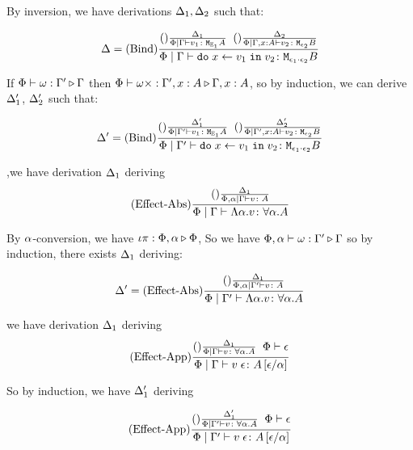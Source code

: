 {    
    By inversion, we have derivations $\Delta_1, \Delta_2$ such that:


    \begin{equation}
        \Delta = (\text{Bind}) \frac{
            (\text{}) \frac{\Delta_1}{\Phi\mid\Gamma \vdash v_1 \colon \texttt{M}_{\mathbb{E}_1}{A}}
            \;\;
            (\text{}) \frac{\Delta_2}{\Phi\mid\Gamma,x: A \vdash v_2 \colon \texttt{M}_{\epsilon_2}{B}}
        }{
            \Phi\mid\Gamma \vdash \texttt{do}\; x \leftarrow v_1 \;\texttt{in}\; v_2 \colon \texttt{M}_{\epsilon_1\cdot\epsilon_2}{B}
        }
    \end{equation}

    If $\Phi\vdash \omega : \Gamma' \triangleright \Gamma$ then $\Phi\vdash \omega\times : \Gamma',x:A \triangleright \Gamma, x: A$, so by induction, we can derive $\Delta_1'$, $\Delta_2'$ such that:

    \begin{equation}
        \Delta' = (\text{Bind}) \frac{
            (\text{}) \frac{\Delta_1'}{\Phi\mid\Gamma' \vdash v_1 \colon \texttt{M}_{\mathbb{E}_1}{A}}
            \;\;
            (\text{}) \frac{\Delta_2'}{\Phi\mid\Gamma',x: A \vdash v_2 \colon \texttt{M}_{\epsilon_2}{B}}
        }{
            \Phi\mid\Gamma' \vdash \texttt{do}\; x \leftarrow v_1 \;\texttt{in}\; v_2 \colon \texttt{M}_{\epsilon_1\cdot\epsilon_2}{B}
        }
    \end{equation}

        \bi,we have derivation $\Delta_1$ deriving
        \begin{equation}
            (\text{Effect-Abs}) \frac{
                    (\text{}) \frac{\Delta_1}{\Phi,\alpha\mid\Gamma \vdash v \colon A}}{\Phi\mid\Gamma \vdash \Lambda \alpha. v \colon \forall \alpha. A
                    }
        \end{equation}
        
        By $\alpha$-conversion, we have $\iota\pi : \Phi,\alpha \triangleright \Phi$,
        So we have $\Phi,\alpha\vdash \omega : \Gamma' \triangleright \Gamma$ so by induction, there exists $\Delta_1$ deriving:

        \begin{equation}
            \D' = 
            \treerule{Effect-Abs}{
                \treerule{}{\D_1}{\etyperelation{\P,\a}{\G'}{v}{A}}
            }{
                \etyperelation{
                    \P
                }{
                    \G'
                }{
                    \elam{\a}{v}
                }{\all{\a}{A}}
            }
        \end{equation}

    \bi we have derivation $\Delta_1$ deriving
    \begin{equation}
        (\text{Effect-App}) \frac{
            (\text{}) \frac{\Delta_1}{\Phi\mid\Gamma \vdash v \colon \forall \alpha. A}
            \;\;
           \Phi\vdash \epsilon
        }{
            \Phi\mid\Gamma \vdash v\;\epsilon \colon A\left[\epsilon / \alpha\right]
        }
    \end{equation}

    So by induction, we have $\Delta_1'$ deriving

    \begin{equation}
        (\text{Effect-App}) \frac{
            (\text{}) \frac{\Delta_1'}{\Phi\mid\Gamma' \vdash v \colon \forall \alpha. A}
            \;\;
           \Phi\vdash \epsilon
        }{
            \Phi\mid\Gamma' \vdash v\;\epsilon \colon A\left[\epsilon / \alpha\right]
        }
    \end{equation}
}

\ifdefined\NoDocument
\else
\documentclass{report}


   \Weakening

\fi